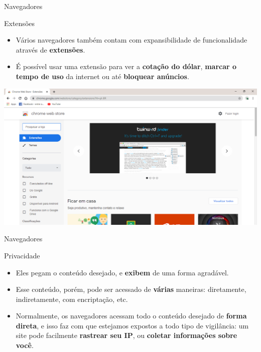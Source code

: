 \begin{frame}{Navegadores}
	\begin{block}{Extensões}
		\begin{itemize}
			\item Vários navegadores também contam com expansibilidade de funcionalidade através de \textbf{extensões}.
			\item É possível usar uma extensão para ver a \textbf{cotação do dólar}, \textbf{marcar o tempo de uso} da internet ou até \textbf{bloquear anúncios}.
		\end{itemize}
	\end{block}

	\centering
	\includegraphics[width=0.7\linewidth]{Figuras/Ch03/fig8.13}
\end{frame}


\begin{frame}{Navegadores}
	\begin{block}{Privacidade}
		\begin{itemize}
			\item Eles pegam o conteúdo desejado, e \textbf{exibem} de uma forma agradável.
			\item Esse conteúdo, porém, pode ser acessado de \textbf{várias} maneiras: diretamente, indiretamente, com encriptação, etc.
			\item Normalmente, os navegadores acessam todo o conteúdo desejado de \textbf{forma direta}, e isso faz com que estejamos expostos a todo tipo de vigilância: um site pode facilmente \textbf{rastrear seu IP}, ou \textbf{coletar informações sobre você}.
		\end{itemize}
	\end{block}
	
\end{frame}


